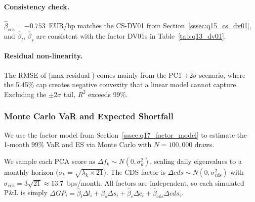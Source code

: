\documentclass[11pt,a4paper]{article}
\begin{document}
\paragraph{Consistency check.}
$\hat\beta_{\text{cds}} = -0.753$~EUR/bp matches the CS-DV01 from
Section~\ref{sssec:q15_cs_dv01}, and $\hat\beta_l$, $\hat\beta_s$ are
consistent with the factor DV01s in Table~\ref{tab:q13_dv01}.

\paragraph{Residual non-linearity.}
The RMSE of  (max residual ) comes mainly from
the PC1 $+2\sigma$ scenario, where the 5.45\% cap creates negative
convexity that a linear model cannot capture.  Excluding the
$\pm 2\sigma$ tail, $R^{2}$ exceeds 99\%.

\subsubsection{Monte Carlo VaR and Expected Shortfall}
\label{sssec:q18_mc_var}

We use the factor model from Section~\ref{sssec:q17_factor_model}
to estimate the 1-month 99\% VaR and ES via Monte Carlo with
$N = 100{,}000$ draws.

We sample each PCA score as $\Delta f_k \sim N(0, \sigma_k^{2})$,
scaling daily eigenvalues to a monthly horizon
($\sigma_k = \sqrt{\lambda_k \times 21}$).  The CDS factor is
$\Delta\mathit{cds} \sim N(0, \sigma_{\text{cds}}^{2})$ with
$\sigma_{\text{cds}} = 3\sqrt{21} \approx 13.7$~bps/month.
All factors are independent, so each simulated P\&L is simply
$\Delta GP_i = \hat\beta_l \Delta l_i + \hat\beta_s \Delta s_i
+ \hat\beta_c \Delta c_i + \hat\beta_{\text{cds}} \Delta\mathit{cds}_i$.
\end{document}

